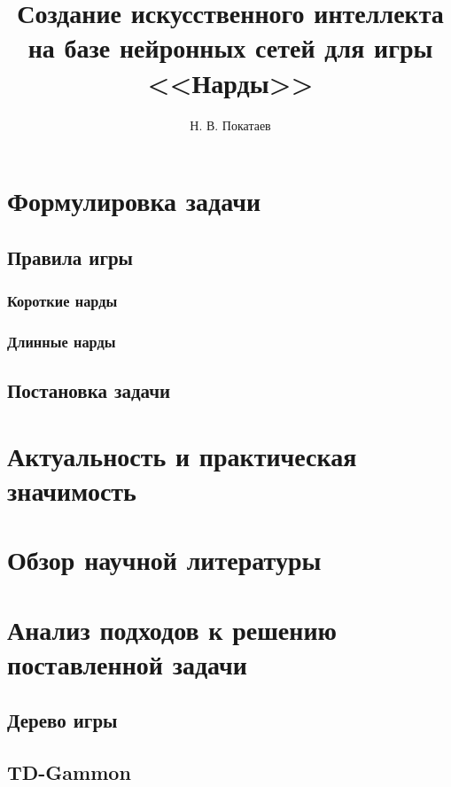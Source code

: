 \documentclass{vsureport}
\title{Создание искусственного интеллекта на базе нейронных сетей для игры <<Нарды>>}
\author{Н. В. Покатаев}
\begin{document}
\maketitle

\tableofcontents



\section{Формулировка задачи}


\subsection{Правила игры}


\subsubsection{Короткие нарды}


\subsubsection{Длинные нарды}


\subsection{Постановка задачи}


\section{Актуальность и практическая значимость}


\section{Обзор научной литературы}


\section{Анализ подходов к решению поставленной задачи}

\subsection{Дерево игры}


\subsection{TD-Gammon}





\end{document}
